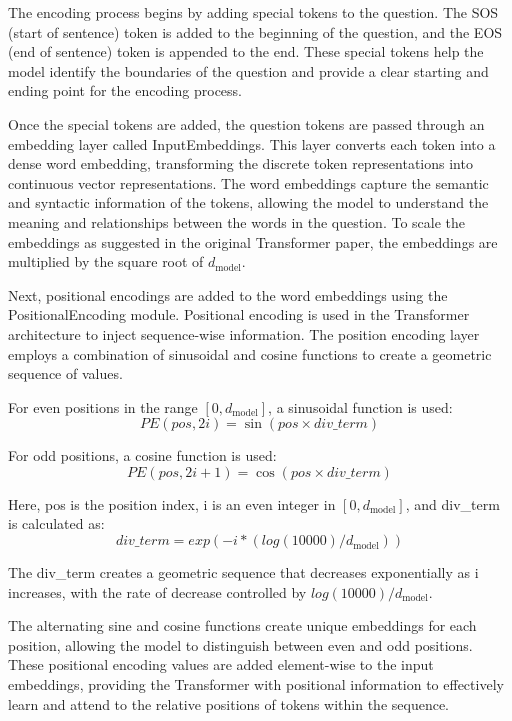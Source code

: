 \documentclass[pdflatex,sn-mathphys-num]{sn-jnl}%
\begin{document}
The encoding process begins by adding special tokens to the question. The SOS (start of sentence) token is added to the beginning of the question, and the EOS (end of sentence) token is appended to the end. These special tokens help the model identify the boundaries of the question and provide a clear starting and ending point for the encoding process.

Once the special tokens are added, the question tokens are passed through an embedding layer called InputEmbeddings. This layer converts each token into a dense word embedding, transforming the discrete token representations into continuous vector representations. The word embeddings capture the semantic and syntactic information of the tokens, allowing the model to understand the meaning and relationships between the words in the question. To scale the embeddings as suggested in the original Transformer paper, the embeddings are multiplied by the square root of $d_{\mathrm{model}}$.

Next, positional encodings are added to the word embeddings using the PositionalEncoding module. Positional encoding is used in the Transformer architecture to inject sequence-wise information. The position encoding layer employs a combination of sinusoidal and cosine functions to create a geometric sequence of values.

For even positions in the range $[0, d_{\mathrm{model}}]$, a sinusoidal function is used: 
\begin{equation}
    PE(pos, 2i) = \sin(pos \times div\_term)
\end{equation}

For odd positions, a cosine function is used:
\begin{equation}
    PE(pos, 2i+1) = \cos(pos \times div\_term)
\end{equation}

Here, pos is the position index, i is an even integer in $[0,d_{\mathrm{model}}]$, and div\_term is calculated as:
\begin{equation}
    div\_term = exp(-i*(log(10000) / d_{\mathrm{model}}))
\end{equation}


The div\_term creates a geometric sequence that decreases exponentially as i increases, with the rate of decrease controlled by $log(10000) / d_{\mathrm{model}}$.

The alternating sine and cosine functions create unique embeddings for each position, allowing the model to distinguish between even and odd positions. These positional encoding values are added element-wise to the input embeddings, providing the Transformer with positional information to effectively learn and attend to the relative positions of tokens within the sequence.
\end{document}
